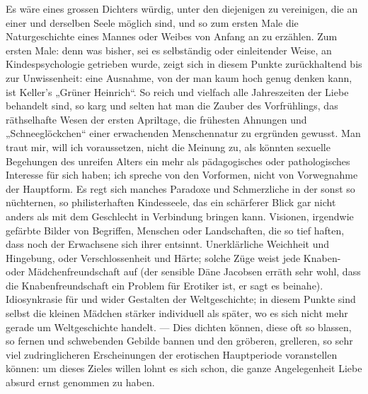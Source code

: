 Es wäre eines grossen Dichters würdig, unter den  diejenigen zu vereinigen, die an einer und derselben Seele möglich sind, und so zum ersten Male die Naturgeschichte eines Mannes oder Weibes von Anfang an zu erzählen. Zum ersten Male: denn was bisher, sei es selbständig oder einleitender Weise, an Kindespsychologie getrieben wurde, zeigt sich in diesem Punkte zurückhaltend bis zur Unwissenheit: eine Ausnahme, von der man kaum hoch genug denken kann, ist Keller’s „Grüner Heinrich“. So reich und vielfach alle Jahreszeiten der Liebe behandelt sind, so karg und selten hat man die Zauber des Vorfrühlings, das räthselhafte Wesen der ersten Apriltage, die frühesten Ahnungen und „Schneeglöckchen“ einer erwachenden Menschennatur zu ergründen gewusst. Man traut mir, will ich voraussetzen, nicht die Meinung zu, als könnten  sexuelle Begehungen des unreifen Alters ein mehr als pädagogisches oder pathologisches Interesse für sich haben; ich spreche von den Vorformen, nicht von Vorwegnahme der Hauptform. Es regt sich manches Paradoxe und Schmerzliche in der sonst so nüchternen, so philisterhaften Kindesseele, das ein schärferer Blick gar nicht anders als mit dem Geschlecht in Verbindung bringen kann. Visionen, irgendwie gefärbte Bilder von Begriffen, Menschen oder Landschaften, die so tief haften, dass noch der Erwachsene sich ihrer entsinnt. Unerklärliche Weichheit und Hingebung, oder Verschlossenheit und Härte; solche Züge weist jede Knaben- oder Mädchenfreundschaft auf (der sensible Däne Jacobsen erräth sehr wohl, dass die Knabenfreundschaft ein Problem für Erotiker ist, er sagt es beinahe). Idiosynkrasie für und wider Gestalten der Weltgeschichte; in diesem Punkte sind selbst die kleinen Mädchen stärker individuell als später, wo es sich nicht mehr gerade um Weltgeschichte handelt. — Dies dichten können, diese oft so blassen, so fernen und schwebenden Gebilde bannen und den gröberen, grelleren, so sehr viel zudringlicheren Erscheinungen der erotischen Hauptperiode voranstellen können: um dieses Zieles willen lohnt es sich schon, die ganze Angelegenheit Liebe absurd ernst genommen zu haben.
\par

